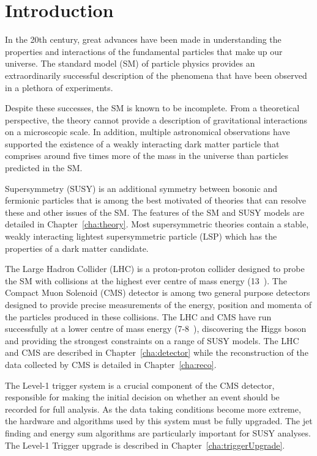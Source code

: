 \chapter{Introduction}
\label{cha:introduction}

In the 20th century, great advances have been made in
understanding the properties and interactions of 
the fundamental particles that make up our universe. 
The standard model (SM) of particle physics provides an 
extraordinarily successful description of the phenomena 
that have been observed in a plethora of experiments.

Despite these successes, the SM is known to be incomplete.
From a theoretical perspective, the theory cannot provide a description of gravitational
interactions on a microscopic scale. In addition, multiple astronomical observations 
have supported the existence of a weakly interacting dark matter particle that
comprises around five times more of the mass in the universe than particles 
predicted in the SM.

Supersymmetry (SUSY) is an additional symmetry between bosonic and fermionic particles 
that is among the best motivated of theories that can resolve these
and other issues of the SM. The features of the SM and SUSY models are detailed 
in Chapter~\ref{cha:theory}. Most supersymmetric theories contain a stable,
weakly interacting lightest supersymmetric particle (LSP) which has the properties 
of a dark matter candidate.

The Large Hadron Collider (LHC) is a proton-proton collider designed to probe the 
SM with collisions at the highest ever centre of mass energy (13~\TeV).
The Compact Muon Solenoid (CMS) detector is among two general purpose detectors
designed to provide precise measurements of the energy, position and momenta of
the particles produced in these collisions. The LHC and CMS have run successfully at a lower centre of 
mass energy (7-8~\TeV), discovering the Higgs boson and providing the strongest 
constraints on a range of SUSY models. The LHC and CMS are described in Chapter~\ref{cha:detector}
while the reconstruction of the data collected by CMS is detailed in Chapter~\ref{cha:reco}.

The Level-1 trigger system is a crucial component of the CMS detector, responsible 
for making the initial decision on whether an event should be recorded 
for full analysis. As the data taking conditions become more extreme, the hardware
and algorithms used by this system must be fully upgraded. The jet finding and energy sum algorithms 
are particularly important for SUSY analyses. The Level-1 Trigger upgrade is described in 
Chapter~\ref{cha:triggerUpgrade}. 

